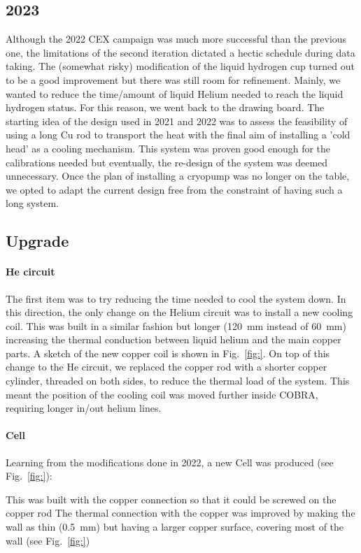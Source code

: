 \begin{refsection}
\section{2023}
    Although the 2022 CEX campaign was much more successful than the previous one, the limitations of the second iteration dictated a hectic schedule during data taking. 
    The (somewhat risky) modification of the liquid hydrogen cup turned out to be a good improvement but there was still room for refinement. 
    Mainly, we wanted to reduce the time/amount of liquid Helium needed to reach the liquid hydrogen status. 
    For this reason, we went back to the drawing board.
    The starting idea of the design used in 2021 and 2022 was to assess the feasibility of using a long Cu rod to transport the heat with the final aim of installing a 'cold head' as a cooling mechanism.
    This system was proven good enough for the calibrations needed but eventually, the re-design of the system was deemed unnecessary.
    Once the plan of installing a cryopump was no longer on the table, we opted to adapt the current design free from the constraint of having such a long system. 

    \subsection{Upgrade}
        \paragraph{He circuit}
        The first item was to try reducing the time needed to cool the system down.
        In this direction, the only change on the Helium circuit was to install a new cooling coil.
        This was built in a similar fashion but longer (\SI{120}{mm} instead of \SI{60}{mm}) increasing the thermal conduction between liquid helium and the main copper parts.
        A sketch of the new copper coil is shown in Fig.~\ref{fig:}.
        On top of this change to the He circuit, we replaced the copper rod with a shorter copper cylinder, threaded on both sides, to reduce the thermal load of the system.
        This meant the position of the cooling coil was moved further inside COBRA, requiring longer in/out helium lines. 
        
        \paragraph{Cell} Learning from the modifications done in 2022, a new Cell was produced (see Fig.~\ref{fig:}):
        \begin{outline}
            \1 This was built with the copper connection so that it could be screwed on the copper rod
            \1 The thermal connection with the copper was improved by making the wall as thin (\SI{0.5}{mm}) but  having a larger copper surface, covering most of the wall (see Fig.~\ref{fig:})
        \end{outline}
        

\end{refsection}
